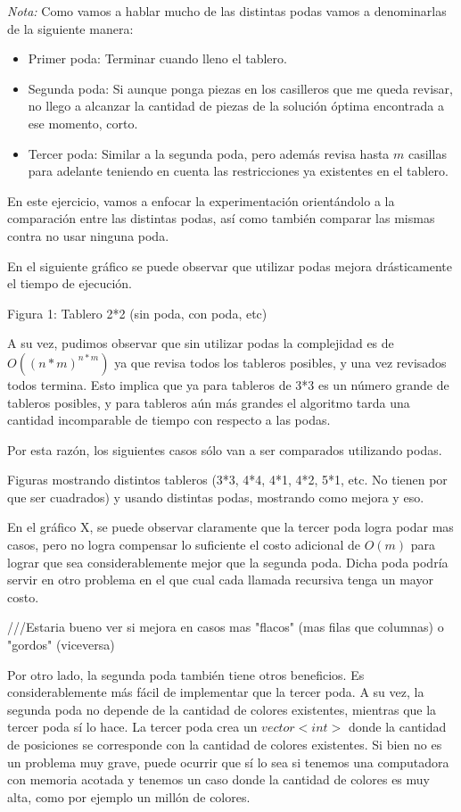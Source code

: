 \emph{Nota:} Como vamos a hablar mucho de las distintas podas vamos a denominarlas de la siguiente manera:
\begin{itemize}
\item Primer poda: Terminar cuando lleno el tablero.
\item Segunda poda: Si aunque ponga piezas en los casilleros que me queda revisar, no llego a alcanzar la cantidad de piezas de la solución óptima encontrada a ese momento, corto.
\item Tercer poda: Similar a la segunda poda, pero además revisa hasta $m$ casillas para adelante teniendo en cuenta las restricciones ya existentes en el tablero.
\end{itemize}

En este ejercicio, vamos a enfocar la experimentación orientándolo a la comparación entre las distintas podas, así como también comparar las mismas contra no usar ninguna poda.

En el siguiente gráfico se puede observar que utilizar podas mejora drásticamente el tiempo de ejecución.

Figura 1: Tablero 2*2 (sin poda, con poda, etc)

A su vez, pudimos observar que sin utilizar podas la complejidad es de $O((n*m)^{n*m})$ ya que revisa todos los tableros posibles, y una vez revisados todos termina. Esto implica que ya para tableros de 3*3 es un número grande de tableros posibles, y para tableros aún más grandes el algoritmo tarda una cantidad incomparable de tiempo con respecto a las podas.

Por esta razón, los siguientes casos sólo van a ser comparados utilizando podas.

Figuras mostrando distintos tableros (3*3, 4*4, 4*1, 4*2, 5*1, etc. No tienen por que ser cuadrados) y usando distintas podas, mostrando como mejora y eso.

En el gráfico X, se puede observar claramente que la tercer poda logra podar mas casos, pero no logra compensar lo suficiente el costo adicional de $O(m)$ para lograr que sea considerablemente mejor que la segunda poda. Dicha poda podría servir en otro problema en el que cual cada llamada recursiva tenga un mayor costo.

///Estaria bueno ver si mejora en casos mas "flacos" (mas filas que columnas) o "gordos" (viceversa)

Por otro lado, la segunda poda también tiene otros beneficios. Es considerablemente más fácil de implementar que la tercer poda. A su vez, la segunda poda no depende de la cantidad de colores existentes, mientras que la tercer poda sí lo hace. La tercer poda crea un $vector<int>$ donde la cantidad de posiciones se corresponde con la cantidad de colores existentes. Si bien no es un problema muy grave, puede ocurrir que sí lo sea si tenemos una computadora con memoria acotada y tenemos un caso donde la cantidad de colores es muy alta, como por ejemplo un millón de colores.
